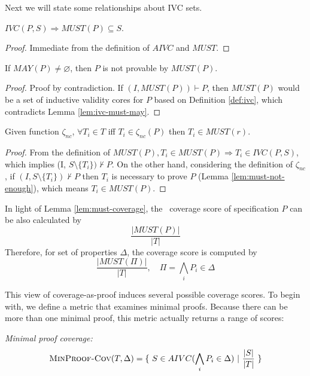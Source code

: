 Next we will state some relationships about IVC sets.

\begin{lemma}
  \label{lem:ivc-must-may}
 $IVC(P, S) \Rightarrow  MUST(P) \subseteq S$.
\end{lemma}
\begin{proof}
 Immediate from the definition of $AIVC$ and $MUST$.
\end{proof}
\vspace{2mm}

\begin{lemma}
  \label{lem:must-not-enough}
  If $MAY(P) \neq \varnothing$, then $P$ is not provable by $MUST(P)$.
\end{lemma}
\begin{proof}
  Proof by contradiction. If $(I, MUST(P)) \vdash P$, then $MUST(P)$
  would be a set of inductive validity cores for $P$ based on Definition \ref{def:ivc},
  which contradicts Lemma \ref{lem:ivc-must-may}.
\end{proof}
\vspace{2mm}

\begin{lemma}
  \label{lem:must-coverage}
  Given function $\zeta_{nc}$, $\forall T_i \in T$ iff
  $T_i \in \zeta_{nc}(P)$ then $T_i \in MUST(r)$.
\end{lemma}
\begin{proof}
 From the definition of $MUST(P), T_i \in MUST (P) \Rightarrow T_i \in IVC(P, S)$,
 which implies (I, $S \setminus \{ T_i \}) \nvdash P$.
 On the other hand, considering the definition of $\zeta_{nc}$, if
 $(I, S \setminus \{ T_i \}) \nvdash P$ then $T_i$ is necessary to prove $P$ (Lemma \ref{lem:must-not-enough}), which means $T_i \in MUST(P)$.
\end{proof}
\vspace{2mm}

In light of Lemma \ref{lem:must-coverage}, the \nondetcov\ coverage score of specification $P$ can be also calculated by
$$\frac{|MUST(P)|}{|T|}$$
Therefore, for set of properties $\Delta$, the coverage score is computed by $$\frac{|MUST(\Pi)|}{|T|},\quad  \Pi= \bigwedge_{i} {P_i \in \Delta}$$
\vspace{0.2in}

This view of coverage-as-proof induces several possible coverage scores.  To begin with, we define a metric that examines minimal proofs.  Because
there can be more than one minimal proof, this metric actually returns a range of scores:
\begin{definition} {\emph{Minimal proof coverage:}} \\
  \label{def:coverage-ivc}
\[
   \text{\sc MinProof-Cov}(T, \Delta) = \{~S \in AIVC(\bigwedge_{i} {P_i \in \Delta})~|~\frac{ |S|}{|T|}~\}
\]
\end{definition}

